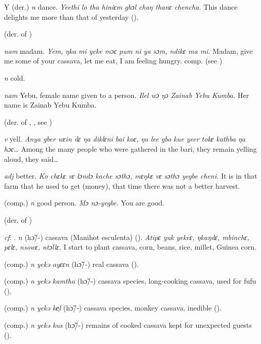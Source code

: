 \begin{letter}{Y}
 (der.) \textit{n} dance. \textit{Yeethi lo tha hiniɛm gbɔl chaŋ thanɛ chencha.} This dance delights me more than that of yesterday (\citealt{Pichl1967}).

 (der. of )

 \textit{nam} madam. \textit{Yem, ŋka mi yeke mɔɛ pum ni ya sɔm, ndikɛ ma mi.} Madam, give me some of your cassava, let me eat, I am feeling hungry. comp.  (see ) 

 \textit{n} cold.

 \textit{nam} Yebu, female name given to a person. \textit{Ilel wɔ ŋɔ Zainab Yebu Kumba.} Her name is Zainab Yebu Kumba.

 (der. of , , see ) 

 \textit{v} yell. \textit{Anya gber wɛin dɛ ŋa diklɛni bai koɛ, ŋa lee gbo kue yeer tokɛ kathba ŋa hɔɛ…} Among the many people who were gathered in the bari, they remain yelling aloud, they said…

 \textit{adj} better. \textit{Ko chɛkɛ vɛ lɔndɔ kache sɔthɔ, mɛŋkɛ vɛ sɔthɔ yegbe cheni.} It is in that farm that he used to get (money), that time there was not a better harvest.

 (comp.) \textit{n} good person. \textit{Mɔ nɔ-yegbe.} You are good.

 (der. of ) 

 \textit{cf}: . \textit{n} (hɔ̃/-) cassava (Manihot esculenta) (\citealt{Pichl1967}). \textit{Atipɛ yuk yekeɛ, ŋkaŋdɛ, mbinchɛ, pɛlɛ, nsowɛ, ntɔllɛ.} I start to plant cassava, corn, beans, rice, millet, Guinea corn. 

 (comp.) \textit{n} \textit{yekə ayɛɛn} (hɔ̃/-) real cassava (\citealt{Pichl1967}). 

 (comp.) \textit{n} \textit{yekə kamtha} (hɔ̃/-) cassava species, long-cooking cassava, used for fufu (\citealt{Pichl1967}). 

 (comp.) \textit{n} \textit{yekə ke̹l} (hɔ̃/-) cassava species, monkey cassava, inedible (\citealt{Pichl1967}). 

 (comp.) \textit{n} \textit{yekə kus} (hɔ̃/-) remains of cooked cassava kept for unexpected guests (\citealt{Pichl1967}). 


\end{letter}
